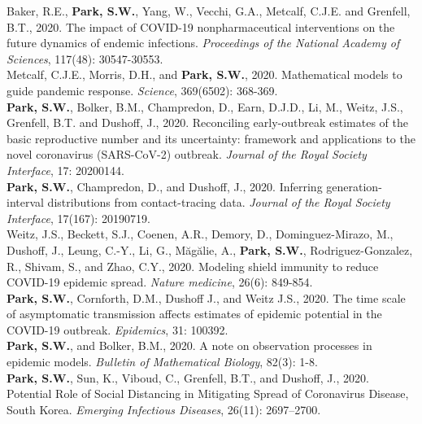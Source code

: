 \documentclass[11pt]{article} %
\begin{document}
 Baker, R.E., \textbf{Park, S.W.}, Yang, W., Vecchi, G.A., Metcalf, C.J.E. and Grenfell, B.T., 2020. The impact of COVID-19 nonpharmaceutical interventions on the future dynamics of endemic infections. \textit{Proceedings of the National Academy of Sciences}, 117(48): 30547-30553.\\

 Metcalf, C.J.E., Morris, D.H., and \textbf{Park, S.W.}, 2020. Mathematical models to guide pandemic response. \textit{Science}, 369(6502): 368-369.\\

 \textbf{Park, S.W.}, Bolker, B.M., Champredon, D., Earn, D.J.D., Li, M., Weitz, J.S., Grenfell, B.T. and Dushoff, J., 2020. Reconciling early-outbreak estimates of the basic reproductive number and its uncertainty: framework and applications to the novel coronavirus (SARS-CoV-2) outbreak. \textit{Journal of the Royal Society Interface}, 17: 20200144.\\

 \textbf{Park, S.W.}, Champredon, D., and Dushoff, J., 2020. Inferring generation-interval distributions from contact-tracing data. \textit{Journal of the Royal Society Interface}, 17(167): 20190719.\\

 Weitz, J.S., Beckett, S.J., Coenen, A.R., Demory, D., Dominguez-Mirazo, M., Dushoff, J., Leung, C.-Y., Li, G., Măgălie, A., \textbf{Park, S.W.}, Rodriguez-Gonzalez, R., Shivam, S., and Zhao, C.Y., 2020. Modeling shield immunity to reduce COVID-19 epidemic spread. \textit{Nature medicine}, 26(6): 849-854.\\

 \textbf{Park, S.W.}, Cornforth, D.M., Dushoff J., and Weitz J.S., 2020. The time scale of asymptomatic transmission affects estimates of epidemic potential in the COVID-19 outbreak. \textit{Epidemics}, 31: 100392.\\

 \textbf{Park, S.W.}, and Bolker, B.M., 2020. A note on observation processes in epidemic models. \textit{Bulletin of Mathematical Biology}, 82(3): 1-8.\\

 \textbf{Park, S.W.}, Sun, K., Viboud, C., Grenfell, B.T., and Dushoff, J., 2020. Potential Role of Social Distancing in Mitigating Spread of Coronavirus Disease, South Korea. \textit{Emerging Infectious Diseases}, 26(11): 2697–2700.\\
\end{document}

